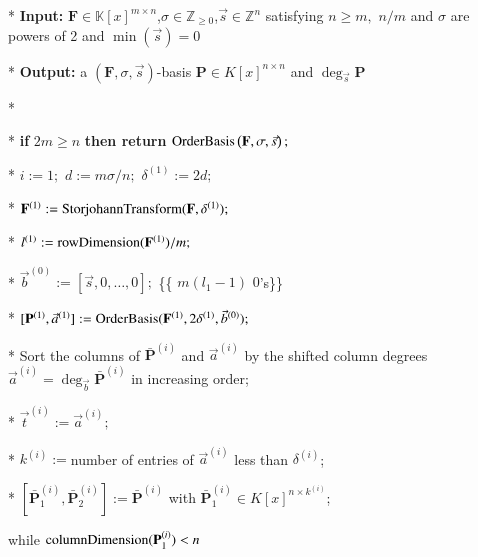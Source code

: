 %
\begin{algorithm}[t]
\caption{$\mmab\left(\mathbf{F},\sigma,\vec{s}\right)$ }


\label{alg:mab} 
\begin{algor}
\item [{{*}}] \textbf{Input:} $\mathbf{F}\in\mathbb{K}\left[x\right]^{m\times n}$,$\sigma\in\mathbb{Z}_{\ge0}$,$\vec{s}\in\mathbb{Z}^{n}$
satisfying $n\ge m,$ $n/m$ and $\sigma$ are powers of 2 and $\min\left(\vec{s}\right)=0$ 
\item [{{*}}] \textbf{Output:} a $\left(\mathbf{F},\sigma,\vec{s}\right)$-basis
$\mathbf{P}\in K\left[x\right]^{n\times n}$ and $\deg_{\vec{s}}\mathbf{P}$
\item [{{*}}]~\end{algor}
\begin{algor}[1]
\item [{{*}}] \textbf{if }$2m\ge n$ \textbf{then return} $\mab\left(\mathbf{F},\sigma,\vec{s}\right);$ 
\item [{{{*}}}] $i:=1;$ $d:=m\sigma/n;$ $\delta^{\left(1\right)}:=2d;$ 
\item [{{{*}}}] $\bar{\mathbf{F}}^{\left(1\right)}:=\StorjohannTransform(\mathbf{F},\delta^{\left(1\right)});$ 
\item [{{{*}}}] $l^{\left(1\right)}:=\rowDimension(\bar{\mathbf{F}}^{\left(1\right)})/m;$ 
\item [{{{*}}}] $\vec{b}^{\left(0\right)}:=\left[\vec{s},0,\dots,0\right];$
\{\{ $m(l_{1}-1)$ $0$'s\}\}
\item [{{{*}}}] $[\bar{\mathbf{P}}^{\left(1\right)},\vec{a}^{\left(1\right)}]:=\mab(\bar{\mathbf{F}}^{\left(1\right)},2\delta^{\left(1\right)},\vec{b}^{\left(0\right)});$ 
\item [{{{*}}}] Sort the columns of $\bar{\mathbf{P}}^{\left(i\right)}$
and $\vec{a}^{\left(i\right)}$ by the shifted column degrees $\vec{a}^{\left(i\right)}=\deg_{\vec{b}}\bar{\mathbf{P}}^{\left(i\right)}$
in increasing order; 
\item [{{*}}] $\vec{t}^{\left(i\right)}:=\vec{a}^{\left(i\right)};$ 
\item [{{{*}}}] $k^{\left(i\right)}:=$number of entries of $\vec{a}^{\left(i\right)}$
less than $\delta^{\left(i\right)}$;
\item [{{*}}] $[\bar{\mathbf{P}}_{1}^{\left(i\right)},\bar{\mathbf{P}}_{2}^{\left(i\right)}]:=\bar{\mathbf{P}}^{\left(i\right)}$
with $\bar{\mathbf{P}}_{1}^{\left(i\right)}\in K\left[x\right]^{n\times k^{\left(i\right)}}$;
\item [{{while}}] $\columnDimension(\bar{\mathbf{P}}_{1}^{\left(i\right)})<n$ 

\end{algor}
\end{algorithm}
